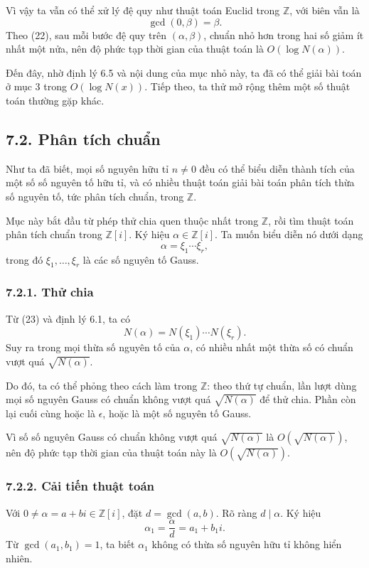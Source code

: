 \documentclass[11pt]{article}
\begin{document}
Vì vậy ta vẫn có thể xử lý đệ quy như thuật toán Euclid trong \(\mathbb Z\),
với biên vẫn là
\[
  \gcd(0,\beta)=\beta.
\]
Theo (22), sau mỗi bước đệ quy trên \((\alpha,\beta)\), chuẩn nhỏ hơn trong
hai số giảm ít nhất một nửa, nên độ phức tạp thời gian của thuật toán là
\(O(\log N(\alpha))\).

Đến đây, nhờ định lý 6.5 và nội dung của mục nhỏ này, ta đã có thể giải bài
toán ở mục 3 trong \(O(\log N(x))\). Tiếp theo, ta thử mở rộng thêm một số
thuật toán thường gặp khác.

\subsection*{7.2. Phân tích chuẩn}

Như ta đã biết, mọi số nguyên hữu tỉ \(n\ne0\) đều có thể biểu diễn thành
tích của một số số nguyên tố hữu tỉ, và có nhiều thuật toán giải bài toán
phân tích thừa số nguyên tố, tức phân tích chuẩn, trong \(\mathbb Z\).

Mục này bắt đầu từ phép thử chia quen thuộc nhất trong \(\mathbb Z\), rồi tìm
thuật toán phân tích chuẩn trong \(\mathbb Z[i]\). Ký hiệu
\(\alpha\in\mathbb Z[i]\). Ta muốn biểu diễn nó dưới dạng
\[
  \alpha=\xi_1\cdots\xi_r,
\tag{23}
\]
trong đó \(\xi_1,\ldots,\xi_r\) là các số nguyên tố Gauss.

\subsubsection*{7.2.1. Thử chia}

Từ (23) và định lý 6.1, ta có
\[
  N(\alpha)=N(\xi_1)\cdots N(\xi_r).
\]
Suy ra trong mọi thừa số nguyên tố của \(\alpha\), có nhiều nhất một thừa số
có chuẩn vượt quá \(\sqrt{N(\alpha)}\).

Do đó, ta có thể phỏng theo cách làm trong \(\mathbb Z\): theo thứ tự chuẩn,
lần lượt dùng mọi số nguyên Gauss có chuẩn không vượt quá \(\sqrt{N(\alpha)}\)
để thử chia. Phần còn lại cuối cùng hoặc là \(\epsilon\), hoặc là một số
nguyên tố Gauss.

Vì số số nguyên Gauss có chuẩn không vượt quá \(\sqrt{N(\alpha)}\) là
\(O(\sqrt{N(\alpha)})\), nên độ phức tạp thời gian của thuật toán này là
\(O(\sqrt{N(\alpha)})\).

\subsubsection*{7.2.2. Cải tiến thuật toán}

Với \(0\ne\alpha=a+bi\in\mathbb Z[i]\), đặt \(d=\gcd(a,b)\). Rõ ràng
\(d\mid\alpha\). Ký hiệu
\[
  \alpha_1=\frac{\alpha}{d}=a_1+b_1i.
\]
Từ \(\gcd(a_1,b_1)=1\), ta biết \(\alpha_1\) không có thừa số nguyên hữu tỉ
không hiển nhiên.
\end{document}
